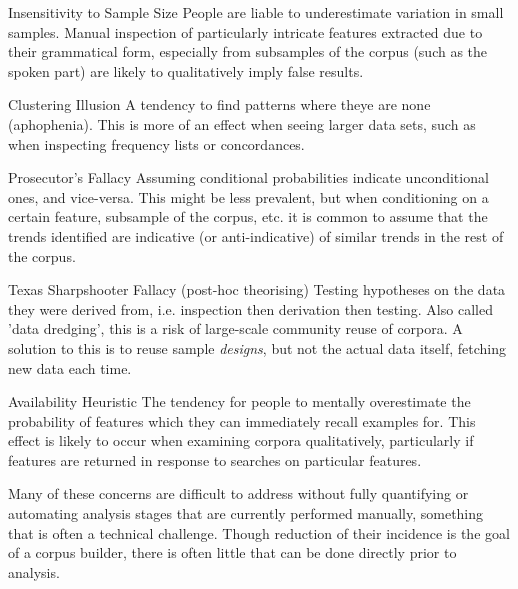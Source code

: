 \begin{itemizeTitle}
    \item[Insensitivity to Sample Size] People are liable to underestimate variation in small samples.  Manual inspection of particularly intricate features extracted due to their grammatical form, especially from subsamples of the corpus (such as the spoken part) are likely to qualitatively imply false results\cite{rabin2000inference}.

    \item[Clustering Illusion] A tendency to find patterns where theye are none (aphophenia).  This is more of an effect when seeing larger data sets, such as when inspecting frequency lists or concordances.

    \item[Prosecutor's Fallacy] Assuming conditional probabilities indicate unconditional ones, and vice-versa.  This might be less prevalent, but when conditioning on a certain feature, subsample of the corpus, etc. it is common to assume that the trends identified are indicative (or anti-indicative) of similar trends in the rest of the corpus.

    \item[Texas Sharpshooter Fallacy (post-hoc theorising)] Testing hypotheses on the data they were derived from, i.e. inspection then derivation then testing.  Also called 'data dredging', this is a risk of large-scale community reuse of corpora.  A solution to this is to reuse sample \textsl{designs}, but not the actual data itself, fetching new data each time.

    \item[Availability Heuristic] The tendency for people to mentally overestimate the probability of features which they can immediately recall examples for\cite{tversky1973availability,schafer2014focused}.  This effect is likely to occur when examining corpora qualitatively, particularly if features are returned in response to searches on particular features.
\end{itemizeTitle}

Many of these concerns are difficult to address without fully quantifying or automating analysis stages that are currently performed manually, something that is often a technical challenge.  Though reduction of their incidence is the goal of a corpus builder, there is often little that can be done directly prior to analysis.


